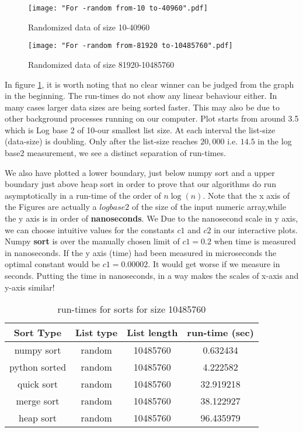 \documentclass[sigconf, nonacm, natbib, screen, balance=False]{acmart}
\begin{document}
\begin{figure}[ht]
\texttt{[image: "For -random from-10 to-40960".pdf]}
    \caption{Randomized data of size 10-40960 }
    \label{fig:random1}
\end{figure}

\begin{figure}[ht]
\texttt{[image: "For -random from-81920 to-10485760".pdf]}
    \caption{Randomized data of size 81920-10485760}
    \label{fig:random2}
\end{figure}

In figure \ref{fig:random1}, it is worth noting that no clear winner can be judged from the graph in the beginning. The run-times do not show any linear behaviour either. In many cases larger data sizes are being sorted faster. This may also be due to other background processes running on our computer. Plot starts from around 3.5 which is Log base 2 of 10-our smallest list size. At each interval the list-size (data-size) is doubling. Only after the list-size reaches \textbf{$20,000$} i.e. \textbf{$14.5$} in the log base2 measurement, we see a distinct separation of run-times.

We also have plotted a lower boundary, just below numpy sort and a upper boundary just above heap sort in order to prove that our algorithms do run asymptotically in a run-time of the order of \textbf{$n\log(n)$}. Note that the x axis of the Figures are actually a $log base 2$ of the size of the input numeric array,while the y axis is in order of \textbf{nanoseconds}. We  Due to the nanosecond scale in y axis, we can choose intuitive values for the constants $c1$ and $c2$  in our interactive plots. Numpy \textbf{sort} is over the manually chosen limit of \textbf{$c1=0.2$} when time is measured in nanoseconds. If the y axis (time) had been measured in microseconds the optimal constant would be $c1=0.00002$. It would get worse if we measure in seconds. Putting the time in nanoseconds, in a way makes the scales of x-axis and y-axis similar!

\begin{table}[ht]
\caption{run-times for sorts for size 10485760}
\label{tab:table1}
\begin{center}
\begin{tabular}{|c|c|c|c|} 
\hline
Sort Type & List type & List length & run-time (sec) \\
\hline
numpy sort &	random &	10485760 &	0.632434 \\
python sorted &	random &	10485760 &	4.222582 \\
quick sort &	random &	10485760 &	32.919218 \\
merge sort &	random &	10485760 &	38.122927 \\
heap sort &	random &	10485760 &	96.435979 \\
\hline
\end{tabular}
\end{center}
\end{table}
\end{document}

